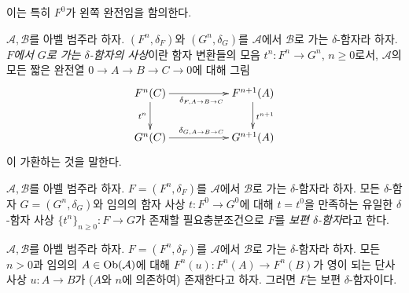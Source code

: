 \noindent
이는 특히 $F^0$가 왼쪽 완전임을 함의한다.

\begin{definition}
\label{definition-morphism-delta-functors}
$\mathcal{A}, \mathcal{B}$를 아벨 범주라 하자.
$(F^n, \delta_F)$와 $(G^n, \delta_G)$를 $\mathcal{A}$에서
$\mathcal{B}$로 가는 $\delta$-함자라 하자.
{\it $F$에서 $G$로 가는 $\delta$-함자의 사상}이란 함자 변환들의 모음
$t^n : F^n \to G^n$, $n \geq 0$로서, $\mathcal{A}$의 모든 짧은
완전열 $0 \to A \to B \to C \to 0$에 대해 그림
$$
\xymatrix{
F^n(C) \ar[d]_{t^n} \ar[rr]_{\delta_{F, A \to B \to C}} &
& F^{n + 1}(A) \ar[d]^{t^{n + 1}} \\
G^n(C) \ar[rr]^{\delta_{G, A \to B \to C}} & & G^{n + 1}(A)
}
$$
이 가환하는 것을 말한다.
\end{definition}

\begin{definition}
\label{definition-universal-delta-functor}
$\mathcal{A}, \mathcal{B}$를 아벨 범주라 하자.
$F = (F^n, \delta_F)$를 $\mathcal{A}$에서 $\mathcal{B}$로 가는
$\delta$-함자라 하자. 모든 $\delta$-함자
$G = (G^n, \delta_G)$와 임의의 함자 사상 $t : F^0 \to G^0$에 대해
$t = t^0$을 만족하는 유일한 $\delta$-함자 사상
$\{t^n\}_{n \geq 0} : F \to G$가 존재할 필요충분조건으로 $F$를
{\it 보편 $\delta$-함자}라고 한다.
\end{definition}

\begin{lemma}
\label{lemma-efface-implies-universal}
$\mathcal{A}, \mathcal{B}$를 아벨 범주라 하자.
$F = (F^n, \delta_F)$를 $\mathcal{A}$에서 $\mathcal{B}$로 가는
$\delta$-함자라 하자. 모든 $n > 0$과 임의의
$A \in \mathop{\mathrm{Ob}}\nolimits(\mathcal{A})$에 대해 $F^n(u) : F^n(A) \to F^n(B)$가
영이 되는 단사 사상 $u : A \to B$가 ($A$와 $n$에 의존하여)
존재한다고 하자. 그러면 $F$는 보편 $\delta$-함자이다.
\end{lemma}

